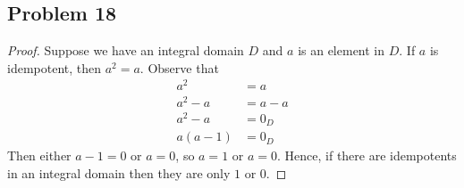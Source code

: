 \documentclass[a4paper,12pt]{article}
\begin{document}
\subsection*{Problem 18}
\begin{proof}
    Suppose we have an integral domain $D$ and $a$ is an element in $D.$ If $a$ is idempotent, then $a^2=a.$ Observe that
    \begin{align*}
        a^2   &=a\\
        a^2-a &=a-a\\
        a^2-a &=0_D\\
        a(a-1)&=0_D
    \end{align*}
    Then either $a-1=0$ or $a=0$, so $a=1$ or $a=0.$ Hence, if there are idempotents in an integral domain then they are only $1$ or $0$.
\end{proof}
\end{document}
